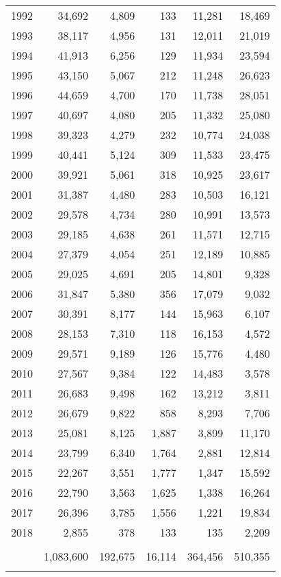 \documentclass[10pt, letterpaper]{article}
\begin{document}
\begin{spacing}{1.0}
\begin{table}[h!]
\begin{tabular}{rrrrrr}
        1992 & 34,692 &  4,809 &    133 & 11,281 & 18,469\\
        1993 & 38,117 &  4,956 &    131 & 12,011 & 21,019\\
        1994 & 41,913 &  6,256 &    129 & 11,934 & 23,594\\
        1995 & 43,150 &  5,067 &    212 & 11,248 & 26,623\\
        1996 & 44,659 &  4,700 &    170 & 11,738 & 28,051\\
        1997 & 40,697 &  4,080 &    205 & 11,332 & 25,080\\
        1998 & 39,323 &  4,279 &    232 & 10,774 & 24,038\\
        1999 & 40,441 &  5,124 &    309 & 11,533 & 23,475\\
        2000 & 39,921 &  5,061 &    318 & 10,925 & 23,617\\
        2001 & 31,387 &  4,480 &    283 & 10,503 & 16,121\\
        2002 & 29,578 &  4,734 &    280 & 10,991 & 13,573\\
        2003 & 29,185 &  4,638 &    261 & 11,571 & 12,715\\
        2004 & 27,379 &  4,054 &    251 & 12,189 & 10,885\\
        2005 & 29,025 &  4,691 &    205 & 14,801 &  9,328\\
        2006 & 31,847 &  5,380 &    356 & 17,079 &  9,032\\
        2007 & 30,391 &  8,177 &    144 & 15,963 &  6,107\\
        2008 & 28,153 &  7,310 &    118 & 16,153 &  4,572\\
        2009 & 29,571 &  9,189 &    126 & 15,776 &  4,480\\
        2010 & 27,567 &  9,384 &    122 & 14,483 &  3,578\\
        2011 & 26,683 &  9,498 &    162 & 13,212 &  3,811\\
        2012 & 26,679 &  9,822 &    858 &  8,293 &  7,706\\
        2013 & 25,081 &  8,125 &  1,887 &  3,899 & 11,170\\
        2014 & 23,799 &  6,340 &  1,764 &  2,881 & 12,814\\
        2015 & 22,267 &  3,551 &  1,777 &  1,347 & 15,592\\
        2016 & 22,790 &  3,563 &  1,625 &  1,338 & 16,264\\
        2017 & 26,396 &  3,785 &  1,556 &  1,221 & 19,834\\
        2018 & 2,855 &   378 &   133 &   135 & 2,209\\[6pt]
        \hline\\[-6pt]
        & 1,083,600 & 192,675 & 16,114 & 364,456 & 510,355\\[2pt]
        \hline\\[-6pt]
    \end{tabular}
\label{tb:YearCaseDistribution}
\end{table}
        

\end{spacing}
\end{document}
